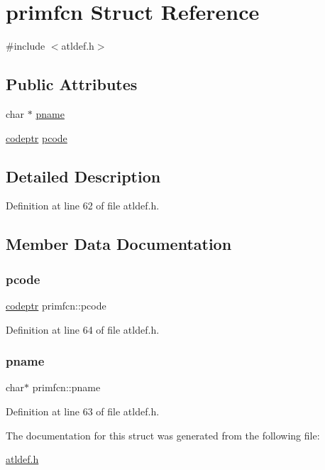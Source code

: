 \hypertarget{structprimfcn}{}\section{primfcn Struct Reference}
\label{structprimfcn}


{\ttfamily \#include $<$atldef.\+h$>$}

\subsection*{Public Attributes}
\begin{DoxyCompactItemize}
\item 
char $\ast$ \hyperlink{structprimfcn_a68b67d3e0a17599e2af683032cd1213d}{pname}
\item 
\hyperlink{atldef_8h_ad466be4642ab9d5805335482af705120}{codeptr} \hyperlink{structprimfcn_a1db6a2c29535872fec76187be6415a2e}{pcode}
\end{DoxyCompactItemize}


\subsection{Detailed Description}


Definition at line 62 of file atldef.\+h.



\subsection{Member Data Documentation}
\mbox{\label{structprimfcn_a1db6a2c29535872fec76187be6415a2e}} 
\subsubsection{\texorpdfstring{pcode}{pcode}}
{\footnotesize\ttfamily \hyperlink{atldef_8h_ad466be4642ab9d5805335482af705120}{codeptr} primfcn\+::pcode}



Definition at line 64 of file atldef.\+h.

\mbox{\label{structprimfcn_a68b67d3e0a17599e2af683032cd1213d}} 
\subsubsection{\texorpdfstring{pname}{pname}}
{\footnotesize\ttfamily char$\ast$ primfcn\+::pname}



Definition at line 63 of file atldef.\+h.



The documentation for this struct was generated from the following file\+:\begin{DoxyCompactItemize}
\item 
\hyperlink{atldef_8h}{atldef.\+h}\end{DoxyCompactItemize}
